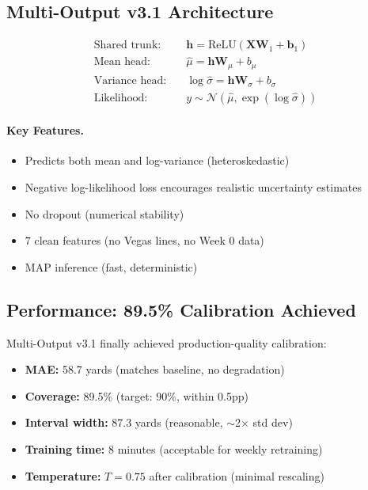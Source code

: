 \subsection{Multi-Output v3.1 Architecture}

\begin{align}
\text{Shared trunk:} \quad &\mathbf{h} = \text{ReLU}(\mathbf{X} \mathbf{W}_1 + \mathbf{b}_1) \\
\text{Mean head:} \quad &\hat{\mu} = \mathbf{h} \mathbf{W}_\mu + b_\mu \\
\text{Variance head:} \quad &\log \hat{\sigma} = \mathbf{h} \mathbf{W}_\sigma + b_\sigma \\
\text{Likelihood:} \quad &y \sim \mathcal{N}(\hat{\mu}, \exp(\log \hat{\sigma}))
\end{align}

\paragraph{Key Features.}
\begin{itemize}
  \item Predicts both mean and log-variance (heteroskedastic)
  \item Negative log-likelihood loss encourages realistic uncertainty estimates
  \item No dropout (numerical stability)
  \item 7 clean features (no Vegas lines, no Week 0 data)
  \item MAP inference (fast, deterministic)
\end{itemize}

\subsection{Performance: 89.5\% Calibration Achieved}

Multi-Output v3.1 finally achieved production-quality calibration:

\begin{itemize}
  \item \textbf{MAE:} 58.7 yards (matches baseline, no degradation)
  \item \textbf{Coverage:} 89.5\% (target: 90\%, within 0.5pp)
  \item \textbf{Interval width:} 87.3 yards (reasonable, $\sim$2× std dev)
  \item \textbf{Training time:} 8 minutes (acceptable for weekly retraining)
  \item \textbf{Temperature:} $T=0.75$ after calibration (minimal rescaling)
\end{itemize}

